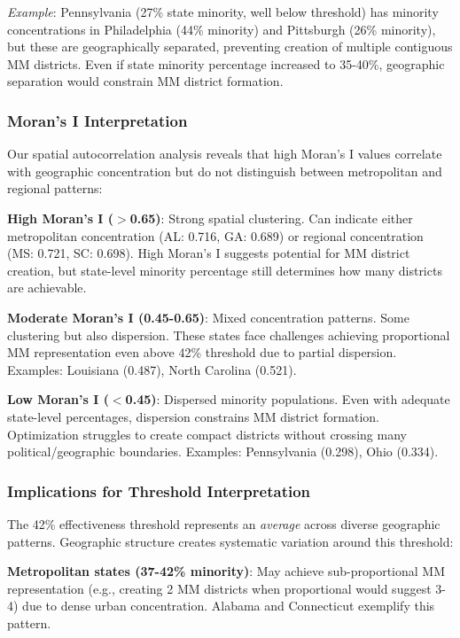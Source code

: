 \textit{Example}: Pennsylvania (27\% state minority, well below threshold) has minority concentrations in Philadelphia (44\% minority) and Pittsburgh (26\% minority), but these are geographically separated, preventing creation of multiple contiguous MM districts. Even if state minority percentage increased to 35-40\%, geographic separation would constrain MM district formation.

\subsubsection{Moran's I Interpretation}

Our spatial autocorrelation analysis reveals that high Moran's I values correlate with geographic concentration but do not distinguish between metropolitan and regional patterns:

\textbf{High Moran's I ($>$0.65)}: Strong spatial clustering. Can indicate either metropolitan concentration (AL: 0.716, GA: 0.689) or regional concentration (MS: 0.721, SC: 0.698). High Moran's I suggests potential for MM district creation, but state-level minority percentage still determines how many districts are achievable.

\textbf{Moderate Moran's I (0.45-0.65)}: Mixed concentration patterns. Some clustering but also dispersion. These states face challenges achieving proportional MM representation even above 42\% threshold due to partial dispersion. Examples: Louisiana (0.487), North Carolina (0.521).

\textbf{Low Moran's I ($<$0.45)}: Dispersed minority populations. Even with adequate state-level percentages, dispersion constrains MM district formation. Optimization struggles to create compact districts without crossing many political/geographic boundaries. Examples: Pennsylvania (0.298), Ohio (0.334).

\subsubsection{Implications for Threshold Interpretation}

The 42\% effectiveness threshold represents an \textit{average} across diverse geographic patterns. Geographic structure creates systematic variation around this threshold:

\textbf{Metropolitan states (37-42\% minority)}: May achieve sub-proportional MM representation (e.g., creating 2 MM districts when proportional would suggest 3-4) due to dense urban concentration. Alabama and Connecticut exemplify this pattern.

